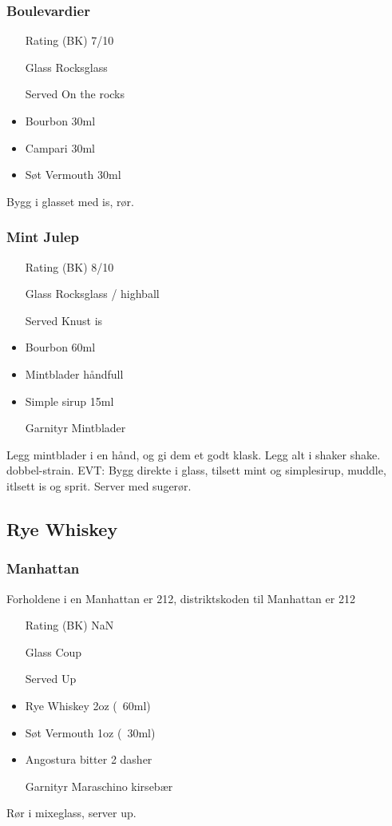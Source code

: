 \subsubsection{Boulevardier}
\begin{itemize}
    \item[Rating (BK)] 7/10 
    \item[Glass] Rocksglass
    \item[Served] On the rocks
    \item Bourbon 30ml
    \item Campari 30ml
    \item Søt Vermouth 30ml
\end{itemize}
Bygg i glasset med is, rør.

\subsubsection{Mint Julep}
\begin{itemize}
    \item[Rating (BK)] 8/10 
    \item[Glass] Rocksglass / highball
    \item[Served] Knust is
    \item Bourbon 60ml
    \item Mintblader håndfull
    \item Simple sirup 15ml
    \item[Garnityr] Mintblader
\end{itemize}
Legg mintblader i en hånd, og gi dem et godt klask. Legg alt i shaker shake. dobbel-strain.
EVT: Bygg direkte i glass, tilsett mint og simplesirup, muddle, itlsett is og sprit.
Server med sugerør.

\subsection{Rye Whiskey}
\subsubsection{Manhattan}
\label{drink:manhattan}
Forholdene i en Manhattan er 212, distriktskoden til Manhattan er 212
\begin{itemize}
    \item[Rating (BK)] NaN
    \item[Glass] Coup
    \item[Served] Up
    \item Rye Whiskey 2oz (~60ml)
    \item Søt Vermouth 1oz (~30ml)
    \item Angostura bitter 2 dasher
    \item[Garnityr] Maraschino kirsebær 
\end{itemize}
Rør i mixeglass, server up.


